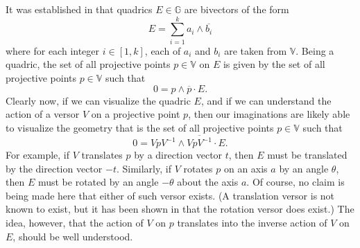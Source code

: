 \documentclass{birkjour}
\theoremstyle{definition}
\theoremstyle{remark}
\numberwithin{equation}{section}
\newcommand{\G}{\mathbb{G}}
\newcommand{\V}{\mathbb{V}}
\begin{document}
It was established in \cite{Parkin12} that quadrics $E\in\G$ are bivectors
of the form
\begin{equation}\label{equ_quadric_form}
E = \sum_{i=1}^k a_i\wedge\overline{b_i}
\end{equation}
where for each integer $i\in[1,k]$, each of $a_i$ and $b_i$ are
taken from $\V$.  Being a quadric, the set of all projective points
$p\in\V$ on $E$ is given by the set of all projective points $p\in\V$
such that
\begin{equation}\label{equ_quadric_representation}
0 = p\wedge\overline{p}\cdot E.
\end{equation}
Clearly now, if we can visualize the quadric $E$, and if we can understand the action
of a versor $V$ on a projective point $p$, then our imaginations are likely able
to visualize the geometry that is the set of all projective points $p\in\V$ such that
\begin{equation}\label{equ_quadric_transformed}
0 = VpV^{-1}\wedge\overline{VpV^{-1}}\cdot E.
\end{equation}
For example, if $V$ translates $p$ by a direction vector $t$, then $E$ must be
translated by the direction vector $-t$.  Similarly, if $V$ rotates $p$ on
an axis $a$ by an angle $\theta$, then $E$ must be rotated by an
angle $-\theta$ about the axis $a$.  Of course, no
claim is being made here that either of such versor exists.  (A translation
versor is not known to exist, but it has been shown in \cite{Parkin12} that the
rotation versor does exist.)  The idea, however,
that the action of $V$ on $p$ translates into the inverse
action of $V$ on $E$, should be well understood.
\end{document}
